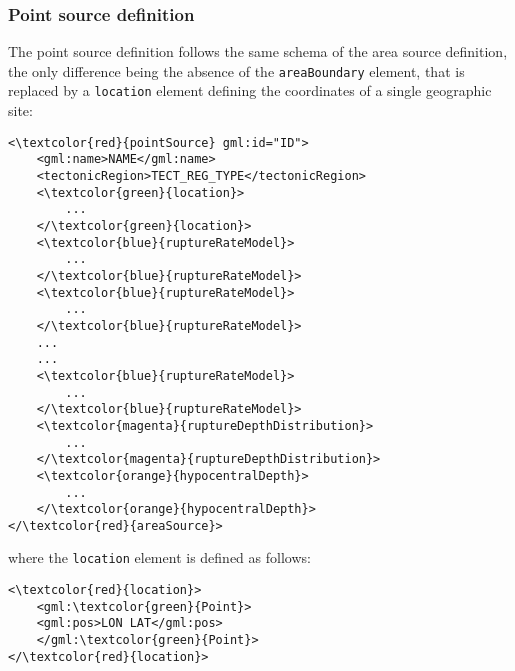 \subsubsection{Point source definition}
The point source definition follows the same schema of the area source definition, the only
difference being the absence of the \Verb+areaBoundary+ element, that is replaced by a
\Verb+location+ element defining the coordinates of a single geographic site:
\begin{Verbatim}[frame=single, commandchars=\\\{\},fontsize=\normalsize, samepage=true]
<\textcolor{red}{pointSource} gml:id="ID">
	<gml:name>NAME</gml:name>
	<tectonicRegion>TECT_REG_TYPE</tectonicRegion>
	<\textcolor{green}{location}>
		...
	</\textcolor{green}{location}>
	<\textcolor{blue}{ruptureRateModel}>
		...
	</\textcolor{blue}{ruptureRateModel}>
	<\textcolor{blue}{ruptureRateModel}>
		...
	</\textcolor{blue}{ruptureRateModel}>
	...
	...
	<\textcolor{blue}{ruptureRateModel}>
		...
	</\textcolor{blue}{ruptureRateModel}>
	<\textcolor{magenta}{ruptureDepthDistribution}>
		...
	</\textcolor{magenta}{ruptureDepthDistribution}>
	<\textcolor{orange}{hypocentralDepth}>
		...	
	</\textcolor{orange}{hypocentralDepth}>
</\textcolor{red}{areaSource}>
\end{Verbatim}
where the \Verb+location+ element is defined as follows:
\begin{Verbatim}[frame=single, commandchars=\\\{\},fontsize=\normalsize, samepage=true]
<\textcolor{red}{location}>
	<gml:\textcolor{green}{Point}>
	<gml:pos>LON LAT</gml:pos>
	</gml:\textcolor{green}{Point}>
</\textcolor{red}{location}>
\end{Verbatim}

